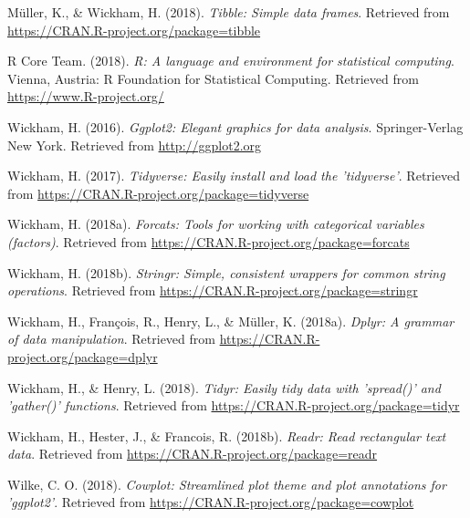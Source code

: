 \documentclass[man,floatsintext]{apa6}
\begin{document}
\leavevmode\hypertarget{ref-R-tibble}{}%
Müller, K., \& Wickham, H. (2018). \emph{Tibble: Simple data frames}.
Retrieved from \url{https://CRAN.R-project.org/package=tibble}

\leavevmode\hypertarget{ref-R-base}{}%
R Core Team. (2018). \emph{R: A language and environment for statistical
computing}. Vienna, Austria: R Foundation for Statistical Computing.
Retrieved from \url{https://www.R-project.org/}

\leavevmode\hypertarget{ref-R-ggplot2}{}%
Wickham, H. (2016). \emph{Ggplot2: Elegant graphics for data analysis}.
Springer-Verlag New York. Retrieved from \url{http://ggplot2.org}

\leavevmode\hypertarget{ref-R-tidyverse}{}%
Wickham, H. (2017). \emph{Tidyverse: Easily install and load the
'tidyverse'}. Retrieved from
\url{https://CRAN.R-project.org/package=tidyverse}

\leavevmode\hypertarget{ref-R-forcats}{}%
Wickham, H. (2018a). \emph{Forcats: Tools for working with categorical
variables (factors)}. Retrieved from
\url{https://CRAN.R-project.org/package=forcats}

\leavevmode\hypertarget{ref-R-stringr}{}%
Wickham, H. (2018b). \emph{Stringr: Simple, consistent wrappers for
common string operations}. Retrieved from
\url{https://CRAN.R-project.org/package=stringr}

\leavevmode\hypertarget{ref-R-dplyr}{}%
Wickham, H., François, R., Henry, L., \& Müller, K. (2018a).
\emph{Dplyr: A grammar of data manipulation}. Retrieved from
\url{https://CRAN.R-project.org/package=dplyr}

\leavevmode\hypertarget{ref-R-tidyr}{}%
Wickham, H., \& Henry, L. (2018). \emph{Tidyr: Easily tidy data with
'spread()' and 'gather()' functions}. Retrieved from
\url{https://CRAN.R-project.org/package=tidyr}

\leavevmode\hypertarget{ref-R-readr}{}%
Wickham, H., Hester, J., \& Francois, R. (2018b). \emph{Readr: Read
rectangular text data}. Retrieved from
\url{https://CRAN.R-project.org/package=readr}

\leavevmode\hypertarget{ref-R-cowplot}{}%
Wilke, C. O. (2018). \emph{Cowplot: Streamlined plot theme and plot
annotations for 'ggplot2'}. Retrieved from
\url{https://CRAN.R-project.org/package=cowplot}

\endgroup

\newpage
\setcounter{table}{0}  \renewcommand{\thetable}{S\arabic{table}} \setcounter{figure}{0} \renewcommand{\thefigure}{S\arabic{figure}}
\end{document}
